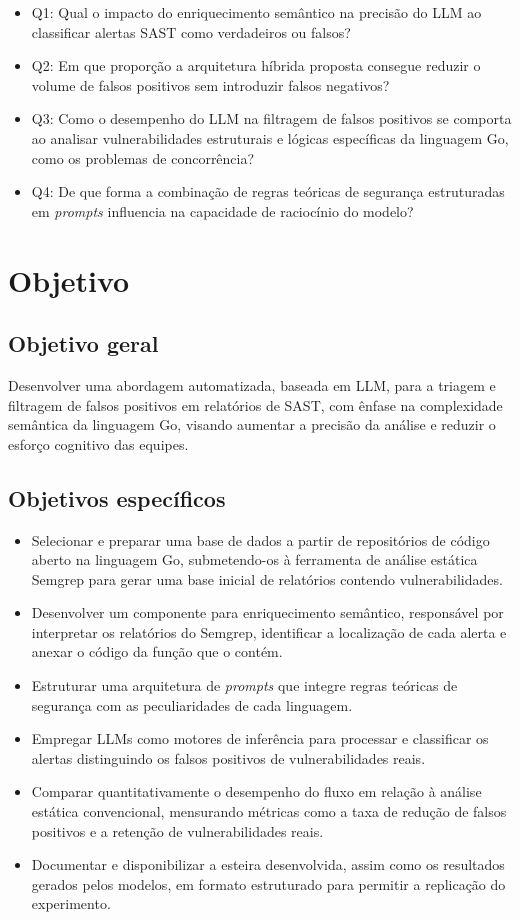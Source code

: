 \begin{itemize}
    \item Q1: Qual o impacto do enriquecimento semântico na precisão do LLM ao classificar alertas SAST como verdadeiros ou falsos?
    \item Q2: Em que proporção a arquitetura híbrida proposta consegue reduzir o volume de falsos positivos sem introduzir falsos negativos?
    \item Q3: Como o desempenho do LLM na filtragem de falsos positivos se comporta ao analisar vulnerabilidades estruturais e lógicas específicas da linguagem Go, como os problemas de concorrência?
    \item Q4: De que forma a combinação de regras teóricas de segurança estruturadas em \textit{prompts} influencia na capacidade de raciocínio do modelo?
\end{itemize}

\section{Objetivo}

\subsection{Objetivo geral}
Desenvolver uma abordagem automatizada, baseada em LLM, para a triagem e filtragem de falsos positivos em relatórios de SAST, com ênfase na complexidade semântica da linguagem Go, visando aumentar a precisão da análise e reduzir o esforço cognitivo das equipes.

\subsection{Objetivos específicos}
\begin{itemize}
    \item Selecionar e preparar uma base de dados a partir de repositórios de código aberto na linguagem Go, submetendo-os à ferramenta de análise estática Semgrep para gerar uma base inicial de relatórios contendo vulnerabilidades.
    \item Desenvolver um componente para enriquecimento semântico, responsável por interpretar os relatórios do Semgrep, identificar a localização de cada alerta e anexar o código da função que o contém.
    \item Estruturar uma arquitetura de \textit{prompts} que integre regras teóricas de segurança com as peculiaridades de cada linguagem.
    \item Empregar LLMs como motores de inferência para processar e classificar os alertas distinguindo os falsos positivos de vulnerabilidades reais.
    \item Comparar quantitativamente o desempenho do fluxo em relação à análise estática convencional, mensurando métricas como a taxa de redução de falsos positivos e a retenção de vulnerabilidades reais.
    \item Documentar e disponibilizar a esteira desenvolvida, assim como os resultados gerados pelos modelos, em formato estruturado para permitir a replicação do experimento.
\end{itemize}

